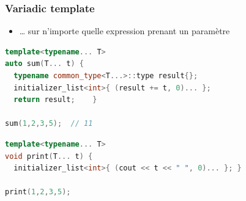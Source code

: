 \documentclass[C++.tex]{subfiles}
\begin{document}
\begin{frame}[fragile]
	\frametitle{Variadic template}
	\begin{itemize}
		\item \ldots{} sur n'importe quelle expression prenant un paramètre

	\end{itemize}

	\begin{lstlisting}[language=C++]
template<typename... T>
auto sum(T... t) {
  typename common_type<T...>::type result{};
  initializer_list<int>{ (result += t, 0)... };
  return result; 	}

sum(1,2,3,5);  // 11\end{lstlisting}

	\begin{lstlisting}[language=C++]
template<typename... T>
void print(T... t) {
  initializer_list<int>{ (cout << t << " ", 0)... }; }

print(1,2,3,5);\end{lstlisting}
\end{frame}
\end{document}
